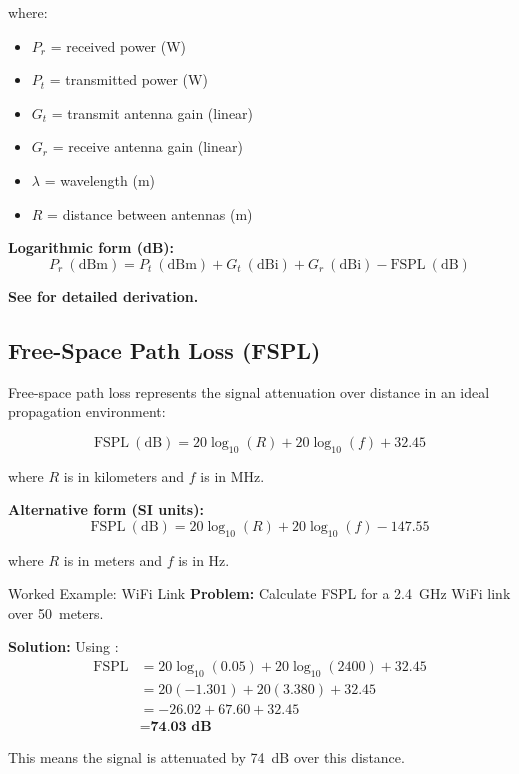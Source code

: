 where:
\begin{itemize}
\item $P_r$ = received power (W)
\item $P_t$ = transmitted power (W)
\item $G_t$ = transmit antenna gain (linear)
\item $G_r$ = receive antenna gain (linear)
\item $\lambda$ = wavelength (m)
\item $R$ = distance between antennas (m)
\end{itemize}

\textbf{Logarithmic form (dB):}
\begin{equation}
\label{eq:friis-db}
P_r\ (\text{dBm}) = P_t\ (\text{dBm}) + G_t\ (\text{dBi}) + G_r\ (\text{dBi}) - \text{FSPL}\ (\text{dB})
\end{equation}

\textbf{See  for detailed derivation.}

\subsection{Free-Space Path Loss (FSPL)}
\label{subsec:fspl}

Free-space path loss represents the signal attenuation over distance in an ideal propagation environment:

\begin{equation}
\label{eq:fspl-km-mhz}
\text{FSPL}\ (\text{dB}) = 20\log_{10}(R) + 20\log_{10}(f) + 32.45
\end{equation}

where $R$ is in kilometers and $f$ is in MHz.

\textbf{Alternative form (SI units):}
\begin{equation}
\label{eq:fspl-m-hz}
\text{FSPL}\ (\text{dB}) = 20\log_{10}(R) + 20\log_{10}(f) - 147.55
\end{equation}

where $R$ is in meters and $f$ is in Hz.

\begin{calloutbox}{Worked Example: WiFi Link}
\textbf{Problem:} Calculate FSPL for a 2.4~GHz WiFi link over 50~meters.

\textbf{Solution:} Using :
\begin{align*}
\text{FSPL} &= 20\log_{10}(0.05) + 20\log_{10}(2400) + 32.45 \\
&= 20(-1.301) + 20(3.380) + 32.45 \\
&= -26.02 + 67.60 + 32.45 \\
&= \textbf{74.03~dB}
\end{align*}

This means the signal is attenuated by 74~dB over this distance.
\end{calloutbox}

